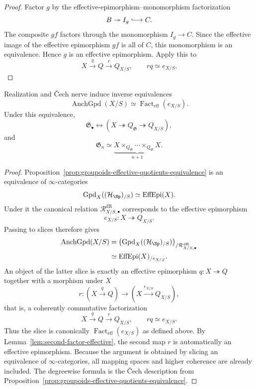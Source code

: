 \begin{proof}
Factor $g$ by the effective-epimorphism--monomorphism factorization
\[
    B\twoheadrightarrow I_g\lhook\joinrel\longrightarrow C.
\]
The composite $gf$ factors through the monomorphism $I_g\to C$.  Since the
effective image of the effective epimorphism $gf$ is all of $C$, this
monomorphism is an equivalence.  Hence $g$ is an effective epimorphism.
Apply this to
\[
    X\xrightarrow{q}Q\xrightarrow{r}Q_{X/S},
    \qquad
    rq\simeq e_{X/S}.
\]
\end{proof}

\begin{theorem}
\label{thm:anchored-gpd-quotient-classification}
Realization and \v{C}ech nerve induce inverse equivalences
\[
    \operatorname{AnchGpd}(X/S)
    \simeq
    \operatorname{Fact}_{\mathrm{eff}}(e_{X/S}).
\]
Under this equivalence,
\[
    \mathfrak G_\bullet
    \longleftrightarrow
    \left(
        X\twoheadrightarrow Q_{\mathfrak G}
        \twoheadrightarrow Q_{X/S}
    \right),
\]
and
\[
    \mathfrak G_n
    \simeq
    \underbrace{
    X\times_{Q_{\mathfrak G}}\cdots
    \times_{Q_{\mathfrak G}}X
    }_{n+1}.
\]
\end{theorem}

\begin{proof}
Proposition~\ref{prop:groupoids-effective-quotients-equivalence} is an
equivalence of $\infty$-categories
\[
    \operatorname{Gpd}_X((\mathcal H_{\Sp})_{/S})
    \simeq
    \operatorname{EffEpi}(X).
\]
Under it the canonical relation
$\mathcal R^{\mathrm{dR}}_{X/S,\bullet}$ corresponds to the effective epimorphism
\[
    e_{X/S}:X\twoheadrightarrow Q_{X/S}.
\]
Passing to slices therefore gives
\[
\begin{aligned}
    \operatorname{AnchGpd}(X/S)
    &=
    \left(
        \operatorname{Gpd}_X((\mathcal H_{\Sp})_{/S})
    \right)_{/\mathcal R^{\mathrm{dR}}_{X/S,\bullet}}\\
    &\simeq
    \operatorname{EffEpi}(X)_{/e_{X/S}}.
\end{aligned}
\]
An object of the latter slice is exactly an effective epimorphism
$q:X\twoheadrightarrow Q$ together with a morphism under $X$
\[
    r:(X\xrightarrow{q}Q)
    \longrightarrow
    (X\xrightarrow{e_{X/S}}Q_{X/S}),
\]
that is, a coherently commutative factorization
\[
    X\xrightarrow{q}Q\xrightarrow{r}Q_{X/S},
    \qquad
    rq\simeq e_{X/S}.
\]
Thus the slice is canonically
$\operatorname{Fact}_{\mathrm{eff}}(e_{X/S})$ as defined above.  By
Lemma~\ref{lem:second-factor-effective}, the second map $r$ is automatically
an effective epimorphism.  Because the argument is obtained by slicing an
equivalence of $\infty$-categories, all mapping spaces and higher coherence
are already included.  The degreewise formula is the \v{C}ech description
from Proposition~\ref{prop:groupoids-effective-quotients-equivalence}.
\end{proof}

